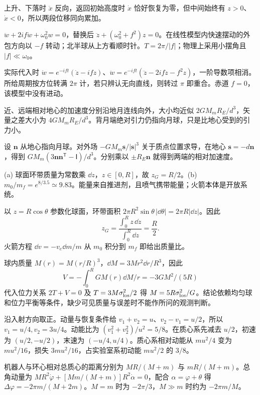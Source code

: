 \begin{bookexercises}
上升、下落时 $\ddot x$ 反向，返回初始高度时 $\dot x$ 恰好恢复为零，但中间始终有 $z>0$、$\dot x<0$，所以两段位移同向累加。
\item $\ddot w+2if\dot w+\omega_0^2w=0$，替换后 $\ddot z+(\omega_0^2+f^2)z=0$。在线性模型内快速摆动的外包方向以 $-f$ 转动；北半球从上方看顺时针。$T=2\pi/|f|$；物理上采用小摆角且 $|f|\ll\omega_0$。

实际代入时 $\dot w=e^{-ift}(\dot z-ifz)$、$\ddot w=e^{-ift}(\ddot z-2if\dot z-f^2z)$，一阶导数项相消。所给周期按方位转满 $2\pi$ 计，若只辨认无向直线，则转过 $\pi$ 即重合。赤道 $f=0$，该模型中没有进动。
\item 近、远端相对地心的加速度分别沿地月连线向外，大小均近似 $2GM_mR_E/d^3$，矢量之差大小为 $4GM_mR_E/d^3$。背月端绝对引力仍指向月球，只是比地心受到的引力小。

设 $\boldsymbol n$ 从地心指向月球。对外场 $-GM_m\boldsymbol s/|\boldsymbol s|^3$ 关于质点位置求导，在地心 $\boldsymbol s=-d\boldsymbol n$，得到 $GM_m(3\boldsymbol n\boldsymbol n^{\mathsf T}-\mathsf I)/d^3$。分别乘以 $\pm R_E\boldsymbol n$ 就得到两端的相对加速度。
\item (a) 球面环带质量为常数乘 $\dd z$，$z\in[0,R]$，故 $z_G=R/2$。(b) $m_0/m_f=e^{8/3.5}\simeq9.83$。能量来自推进剂，且喷气携带能量；火箭本体是开放系统。

以 $z=R\cos\theta$ 参数化球面，环带面积 $2\pi R^2\sin\theta\,|\dd\theta|=2\pi R|\dd z|$。因此
\[
z_G=\frac{\int_0^R z\,\dd z}{\int_0^R\dd z}=\frac R2.
\]火箭方程 $\dd v=-v_e\dd m/m$ 从 $m_0$ 积分到 $m_f$ 即给出质量比。
\item 球内质量 $M(r)=M(r/R)^3$，$\dd M=3Mr^2\dd r/R^3$，因此 
\[V=-\int_0^R GM(r)\dd M/r=-3GM^2/(5R)\]
代入位力关系 $2T+V=0$ 及 $T=3M\sigma_{\rm los}^2/2$ 得 $M=5R\sigma_{\rm los}^2/G$。结论依赖均匀球和位力平衡等条件，缺少可见质量与误差时不能作所问的观测判断。
\item 沿入射方向取正。动量与恢复条件给 $v_1+v_2=u$、$v_2-v_1=u/2$，所以 $v_1=u/4,v_2=3u/4$。动能比为 $(v_1^2+v_2^2)/u^2=5/8$。在质心系先减去 $u/2$，初速为 $(u/2,-u/2)$，末速为 $(-u/4,u/4)$。质心系相对动能从 $mu^2/4$ 变为 $mu^2/16$，损失 $3mu^2/16$，占实验室系初动能 $mu^2/2$ 的 $3/8$。
\item 机器人与环心相对总质心的距离分别为 $MR/(M+m)$ 与 $mR/(M+m)$。总角动量为 $MR^2\dot\varphi+[Mm/(M+m)]R^2\dot\alpha=0$，配合 $\alpha=\varphi+\theta$ 得 $\Delta\varphi=-2\pi m/(M+2m)$。$M=m$ 时为 $-2\pi/3$，$M\gg m$ 时约为 $-2\pi m/M$。


\end{bookexercises}
